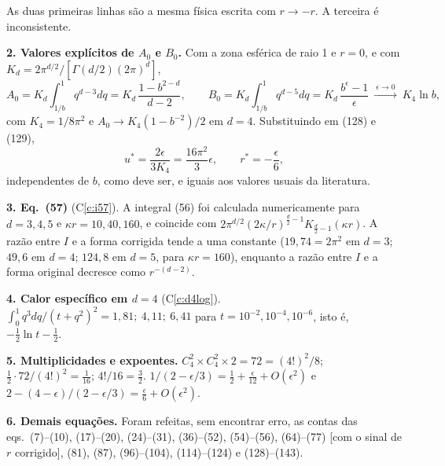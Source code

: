 \documentclass[12pt,a4paper]{article}
\newcounter{corr}
\begin{document}
{As duas primeiras linhas são a mesma física escrita com $r\to-r$. A terceira é inconsistente.

\textbf{2. Valores explícitos de $A_0$ e $B_0$.} Com a zona esférica de raio 1 e $r=0$, e com
$K_d=2\pi^{d/2}/[\Gamma(d/2)(2\pi)^d]$,
\[
A_0=K_d\int_{1/b}^1q^{d-3}dq=K_d\,\frac{1-b^{2-d}}{d-2},\qquad
B_0=K_d\int_{1/b}^1q^{d-5}dq=K_d\,\frac{b^{\epsilon}-1}{\epsilon}\ \xrightarrow{\ \epsilon\to0\ }\ K_4\ln b ,
\]
com $K_4=1/8\pi^2$ e $A_0\to K_4(1-b^{-2})/2$ em $d=4$. Substituindo em (128) e (129),
\[
u^*=\frac{2\epsilon}{3K_4}=\frac{16\pi^2}{3}\epsilon,\qquad r^*=-\frac{\epsilon}{6},
\]
independentes de $b$, como deve ser, e iguais aos valores usuais da literatura.

\textbf{3. Eq.~(57)} (C\ref{c:i57}). A integral (56) foi calculada numericamente para $d=3,4,5$ e
$\kappa r=10,40,160$, e coincide com $2\pi^{d/2}(2\kappa/r)^{\frac d2-1}K_{\frac d2-1}(\kappa r)$.
A razão entre $I$ e a forma corrigida tende a uma constante ($19{,}74=2\pi^2$ em $d=3$; $49{,}6$ em
$d=4$; $124{,}8$ em $d=5$, para $\kappa r=160$), enquanto a razão entre $I$ e a forma original decresce como
$r^{-(d-2)}$.

\textbf{4. Calor específico em $d=4$} (C\ref{c:d4log}). $\int_0^1q^3dq/(t+q^2)^2=1{,}81;\ 4{,}11;\ 6{,}41$
para $t=10^{-2},10^{-4},10^{-6}$, isto é, $-\frac12\ln t-\frac12$.

\textbf{5. Multiplicidades e expoentes.} $C_4^2\times C_4^2\times2=72=(4!)^2/8$;
$\frac12\cdot72/(4!)^2=\frac1{16}$; $4!/16=\frac32$.
$1/(2-\epsilon/3)=\frac12+\frac{\epsilon}{12}+O(\epsilon^2)$ e
$2-(4-\epsilon)/(2-\epsilon/3)=\frac{\epsilon}{6}+O(\epsilon^2)$.

\textbf{6. Demais equações.} Foram refeitas, sem encontrar erro, as contas das eqs.~(7)--(10),
(17)--(20), (24)--(31), (36)--(52), (54)--(56), (64)--(77) [com o sinal de $r$ corrigido],
(81), (87), (96)--(104), (114)--(124) e (128)--(143).
}
\end{document}
